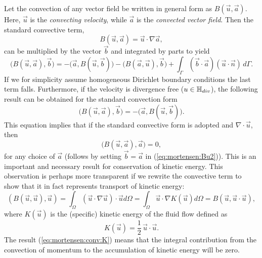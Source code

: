 Let the convection of any vector field be written in general form as $B(\vec{u},\vec{a})$. Here, $\vec{u}$ is the \emph{convecting velocity}, while $\vec{a}$ is the \emph{convected vector field}. Then the standard convective term, 
\begin{equation}
B(\vec{u},\vec{a}) = \vec{u}\cdot \nabla \vec{a}, 
\end{equation}
can be multiplied by the vector $\vec{b}$ and integrated by parts to yield
\begin{equation}
 \bigl( B(\vec{u}, \vec{a}), \vec{b}\bigr) = -\bigl( \vec{a}, B(\vec{u},\vec{b})\bigr) - \bigl( B (\vec{a}, \vec{u}), \vec{b} \bigr) + \int_{\Gamma} \left(\vec{b} \cdot \vec{a} \right)\left(\vec{u} \cdot \vec{n} \right) \, d\Gamma.
\label{eq:mortensen:Bu1}
\end{equation}
If we for simplicity assume homogeneous Dirichlet boundary conditions the last term falls. Furthermore, if the velocity is divergence free (${ u }\in \mathbb{H}_{div}$), the following result can be obtained for the standard convection form
\begin{equation}
\bigl( B(\vec{u},\vec{a}), \vec{b} \bigr) = -\bigl( \vec{a}, B(\vec{u},\vec{b}) \bigr).
\label{eq:mortensen:Bu2}
\end{equation}
This equation implies that if 
the standard convective form is adopted and $\nabla\cdot\vec{u}$, then
\begin{equation} 
\bigl( B(\vec{u}, \vec{a}), \vec{a} \bigr) = 0,
\label{eq:mortensen:B0}
\end{equation}
for any choice of $\vec{a}$ (follows by setting $\vec{b}=\vec{a}$ in
(\eqref{eq:mortensen:Bu2})). This is an important and necessary result for
conservation of kinetic energy. This observation is perhaps more
transparent if we rewrite the convective term to show that it in fact
represents transport of kinetic energy:
\begin{equation}
\label{eq:mortensen:conv:K}
\left(B(\vec{u}, \vec{u}), \vec{u} \right) 
= \int_\Omega (\vec{u}\cdot\nabla\vec{u})\cdot\vec{u}d\Omega
= \int_\Omega \vec{u}\cdot\nabla K(\vec{u}) d\Omega
= B(\vec{u}, \vec{u}\cdot\vec{u}),
\end{equation}
where $K(\vec{u})$ is the (specific) kinetic energy of the fluid flow defined
as
\begin{equation}
 K(\vec{u})=\frac{1}{2}\, \vec{u}\cdot \vec{u}. \label{eq:mortensen:K}
\end{equation}
The result (\eqref{eq:mortensen:conv:K})  means that the integral
contribution from the convection of momentum to the accumulation of
kinetic energy will be zero.

